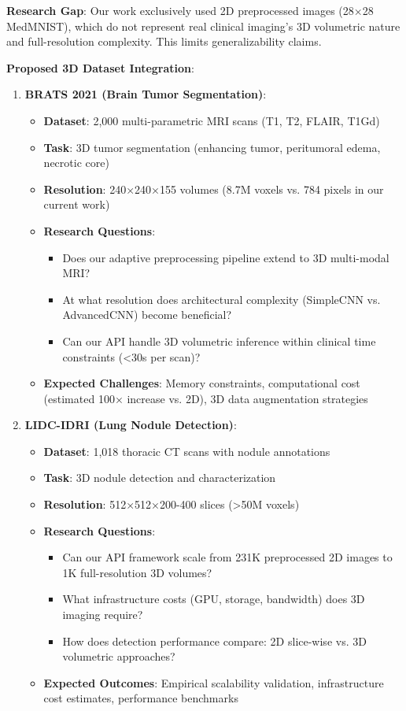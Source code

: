 \documentclass[12pt,a4paper]{article}
\begin{document}
\textbf{Research Gap}: Our work exclusively used 2D preprocessed images (28×28 MedMNIST), which do not represent real clinical imaging's 3D volumetric nature and full-resolution complexity. This limits generalizability claims.

\textbf{Proposed 3D Dataset Integration}:

\begin{enumerate}
    \item \textbf{BRATS 2021 (Brain Tumor Segmentation)}:
    \begin{itemize}
        \item \textbf{Dataset}: 2,000 multi-parametric MRI scans (T1, T2, FLAIR, T1Gd)
        \item \textbf{Task}: 3D tumor segmentation (enhancing tumor, peritumoral edema, necrotic core)
        \item \textbf{Resolution}: 240×240×155 volumes (8.7M voxels vs. 784 pixels in our current work)
        \item \textbf{Research Questions}: 
            \begin{itemize}
                \item Does our adaptive preprocessing pipeline extend to 3D multi-modal MRI?
                \item At what resolution does architectural complexity (SimpleCNN vs. AdvancedCNN) become beneficial?
                \item Can our API handle 3D volumetric inference within clinical time constraints (<30s per scan)?
            \end{itemize}
        \item \textbf{Expected Challenges}: Memory constraints, computational cost (estimated 100× increase vs. 2D), 3D data augmentation strategies
    \end{itemize}
    
    \item \textbf{LIDC-IDRI (Lung Nodule Detection)}:
    \begin{itemize}
        \item \textbf{Dataset}: 1,018 thoracic CT scans with nodule annotations
        \item \textbf{Task}: 3D nodule detection and characterization
        \item \textbf{Resolution}: 512×512×200-400 slices (>50M voxels)
        \item \textbf{Research Questions}:
            \begin{itemize}
                \item Can our API framework scale from 231K preprocessed 2D images to 1K full-resolution 3D volumes?
                \item What infrastructure costs (GPU, storage, bandwidth) does 3D imaging require?
                \item How does detection performance compare: 2D slice-wise vs. 3D volumetric approaches?
            \end{itemize}
        \item \textbf{Expected Outcomes}: Empirical scalability validation, infrastructure cost estimates, performance benchmarks
    \end{itemize}
    

\end{enumerate}
\end{document}

